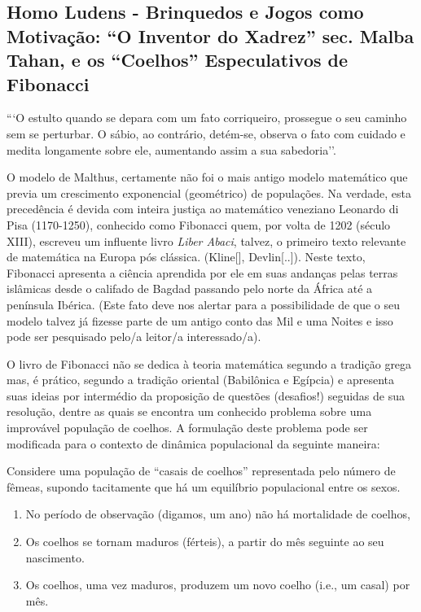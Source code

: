 \subsection{Homo Ludens - Brinquedos e Jogos como Motivação: ``O Inventor do Xadrez'' sec. Malba Tahan, e os ``Coelhos'' Especulativos de Fibonacci}

\begin{citacao}
```O estulto quando se depara com um fato corriqueiro, prossegue o seu caminho sem se perturbar. O sábio, ao contrário, detém-se, observa o fato com cuidado e medita
longamente sobre ele, aumentando assim a sua sabedoria''.

\end{citacao}

    O modelo de Malthus, certamente não foi o mais antigo modelo matemático que previa um crescimento exponencial (geométrico) de populações. Na verdade, esta precedência é devida com inteira justiça ao matemático veneziano Leonardo di Pisa (1170-1250), conhecido como Fibonacci quem, por volta de 1202 (século XIII), escreveu um influente livro \textit{Liber Abaci}, talvez, o primeiro texto relevante de matemática na Europa pós clássica. (Kline[], Devlin[..]). Neste texto, Fibonacci apresenta a ciência aprendida por ele em suas andanças pelas terras islâmicas desde o califado de Bagdad passando pelo norte da África até a península Ibérica. (Este fato deve nos alertar para a possibilidade de que o seu modelo talvez já fizesse parte de um antigo conto das Mil e uma Noites e isso pode ser pesquisado pelo/a leitor/a interessado/a).

    O livro de Fibonacci não se dedica à teoria matemática segundo a tradição grega mas, é prático, segundo a tradição oriental (Babilônica e Egípcia) e apresenta suas ideias por intermédio da proposição de questões (desafios!) seguidas de sua resolução, dentre as quais se encontra um conhecido problema sobre uma improvável população de coelhos. A formulação deste problema pode ser modificada para o contexto de dinâmica populacional da seguinte maneira:

    Considere uma população de ``casais de coelhos'' representada pelo número de fêmeas, supondo tacitamente que há um equilíbrio populacional entre os sexos.

\begin{enumerate}
\item No período de observação (digamos, um ano) não há mortalidade de coelhos,
\item Os coelhos se tornam maduros (férteis), a partir do mês seguinte ao seu nascimento.
\item Os coelhos, uma vez maduros, produzem um novo coelho (i.e., um casal) por mês.
\end{enumerate}


